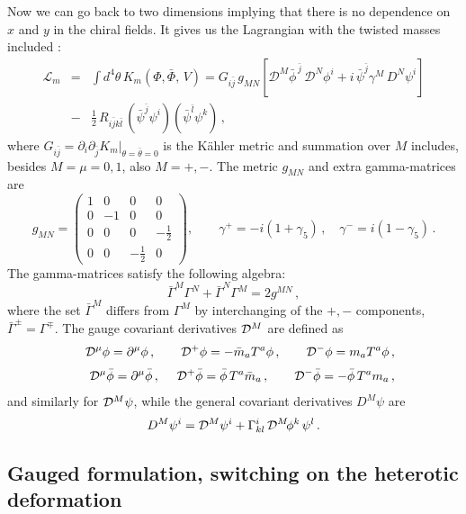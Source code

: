 \documentclass[epsfig,12pt]{article}
\def\beq{\begin{equation}}
\def\eeq{\end{equation}}
\def\beqn{\begin{eqnarray}}
\def\eeqn{\end{eqnarray}}
\newcommand{\cde}{{\mathcal D}}
\def\beqn{\begin{eqnarray}}
\def\eeqn{\end{eqnarray}}
\def\beq{\begin{equation}}
\def\eeq{\end{equation}}
\begin{document}
Now we can go back to two dimensions implying that there is no dependence
on $x$ and $y$ in the chiral fields.  It gives us the Lagrangian with the twisted masses 
included \cite{twisted, Dor}:
\beqn
\label{eq:mtwist}
{\mathcal L}_{m}
&=&
 \int d^{4 }\theta \,K_{m}(\Phi, \bar\Phi,\,V)
=G_{i\bar j}\, g_{MN}\left[ {\cde}^M \bar\phi^{\,\bar j}\, {\cde}^{N} \phi^{i}
+i\,\bar \psi^{\bar j} \gamma^{M}\,D^{N} \psi^{i}\right]
\nonumber\\[3mm]
&-&
\frac{1}{2}\,R_{i\bar jk\bar l}\,(\bar\psi^{\bar j}\psi^{i})(\bar\psi^{\bar l}\psi^{k})\,,
\eeqn
where $G_{i\bar j} =\partial_{i}\partial_{\bar j}K_{m}|_{\theta=\bar\theta=0}$ is the K\"ahler metric 
and summation over $M$ includes, besides $M=\mu=0,1$, also 
$M=+,-$. 
The  metric $g_{MN}$ and extra gamma-matrices are
\begin{equation}
\label{eq:metric}
g_{MN}=\left(\begin{array}{crrr}1& 0& 0 & 0 \\0 & -1 & 0 & 0 \\[1mm]0 & 0 & 0 & -\frac 1 2 \\[1mm]0 & 0 & -\frac 1 2 & 0\end{array}\right),\qquad
\gamma^{+}=-i(1+\gamma_{5})\,,\quad
\gamma^{-}=i(1-\gamma_{5})\,.
\end{equation}
The gamma-matrices satisfy the following algebra:
\beq
\bar\Gamma^{M}\Gamma^{N}+\bar\Gamma^{N}\Gamma^{M}=2 g^{MN}\,,
\eeq
where the set $\bar\Gamma^{M}$ differs from $\Gamma^{M}$  by interchanging of
the $+,-$ components, $\bar\Gamma^{\pm}=\Gamma^{\mp}$.
The gauge covariant derivatives ${\cal D}^M$ are defined as
\beqn
&&
{\mathcal D}^{\mu}\phi=\partial^{\mu}\phi\,,\qquad {\cal D}^{+}\phi=-\bar m_{a}T^{a}\phi\,,
\qquad  {\cal D}^{-}\phi=m_{a}T^{a}\phi\,,
\nonumber\\[1mm]
&& {\cal D}^{\mu}\bar\phi
=\partial^{\mu}\bar\phi\,,
\quad ~{\cde}^{+}\bar\phi =\bar\phi\, T^{a}\bar m_{a}\,,
\qquad  {\cde}^{-}\bar\phi =-\bar \phi\, T^{a} m_{a}\,,
\nonumber\\
\eeqn
and similarly for ${\cal D}^{M}\psi$, while the general covariant derivatives $D^{M}\psi$ are
\begin{equation}
D^{M}\psi^{i}=
{\cal D}^{M}\psi^{i}+\Gamma^{i}_{kl}\,{\cal D}^{M}\! \phi^{k}\,\psi^{l}\,.
\end{equation}



\subsection{Gauged formulation, switching on the heterotic deformation}
\label{gfsothd}
\end{document}
